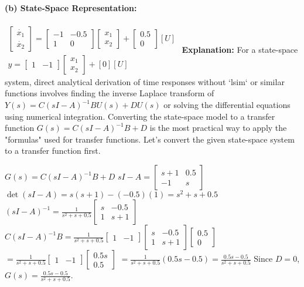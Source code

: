 \documentclass{article}
\begin{document}
	\paragraph{(b) State-Space Representation:}
	$\begin{array}{l} \begin{bmatrix} \dot{x_1} \\ \dot{x_2} \end{bmatrix} = \begin{bmatrix} -1 & -0.5 \\ 1 & 0 \end{bmatrix} \begin{bmatrix} x_1 \\ x_2 \end{bmatrix} + \begin{bmatrix} 0.5 \\ 0 \end{bmatrix} [U] \\ y = \begin{bmatrix} 1 & -1 \end{bmatrix} \begin{bmatrix} x_1 \\ x_2 \end{bmatrix} + [0] [U] \end{array}$
	\textbf{Explanation:}
	For a state-space system, direct analytical derivation of time responses without `lsim` or similar functions involves finding the inverse Laplace transform of $Y(s) = C(sI-A)^{-1}B U(s) + DU(s)$ or solving the differential equations using numerical integration.
	Converting the state-space model to a transfer function $G(s) = C(sI-A)^{-1}B+D$ is the most practical way to apply the "formulas" used for transfer functions.
	Let's convert the given state-space system to a transfer function first.
	
	$G(s) = C(sI-A)^{-1}B+D$
	$sI-A = \begin{bmatrix} s+1 & 0.5 \\ -1 & s \end{bmatrix}$
	$\det(sI-A) = s(s+1) - (-0.5)(1) = s^2+s+0.5$
	$(sI-A)^{-1} = \frac{1}{s^2+s+0.5} \begin{bmatrix} s & -0.5 \\ 1 & s+1 \end{bmatrix}$
	$C(sI-A)^{-1}B = \frac{1}{s^2+s+0.5} \begin{bmatrix} 1 & -1 \end{bmatrix} \begin{bmatrix} s & -0.5 \\ 1 & s+1 \end{bmatrix} \begin{bmatrix} 0.5 \\ 0 \end{bmatrix}$
	$= \frac{1}{s^2+s+0.5} \begin{bmatrix} 1 & -1 \end{bmatrix} \begin{bmatrix} 0.5s \\ 0.5 \end{bmatrix}$
	$= \frac{1}{s^2+s+0.5} (0.5s - 0.5) = \frac{0.5s - 0.5}{s^2+s+0.5}$
	Since $D=0$, $G(s) = \frac{0.5s - 0.5}{s^2+s+0.5}$.
	
\end{document}
